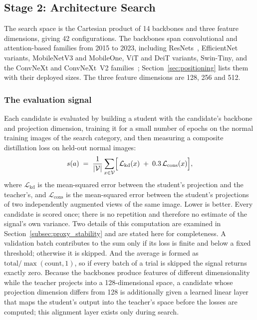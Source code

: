 \subsection{Stage 2: Architecture Search}
\label{subsec:nas}

The search space is the Cartesian product of 14 backbones and three feature
dimensions, giving 42 configurations. The backbones span convolutional and
attention-based families from 2015 to 2023, including
ResNets~\cite{he2016deep}, EfficientNet variants, MobileNetV3 and MobileOne, ViT
and DeiT variants, Swin-Tiny, and the ConvNeXt and ConvNeXt~V2
families~\cite{woo2023convnextv2}; Section~\ref{sec:positioning} lists them with
their deployed sizes. The three feature dimensions are 128, 256 and 512.

\subsubsection*{The evaluation signal}
Each candidate is evaluated by building a student with the candidate's backbone
and projection dimension, training it for a small number of epochs on the normal
training images of the search category, and then measuring a composite
distillation loss on held-out normal images:
%
\begin{equation}
\label{eq:proxy}
s(a) \;=\; \frac{1}{|\mathcal{V}|}\sum_{x \in \mathcal{V}}
\Bigl[\, \mathcal{L}_{\mathrm{kd}}(x) \;+\; 0.3\,\mathcal{L}_{\mathrm{cons}}(x) \Bigr],
\end{equation}
%
where $\mathcal{L}_{\mathrm{kd}}$ is the mean-squared error between the student's
projection and the teacher's, and $\mathcal{L}_{\mathrm{cons}}$ is the
mean-squared error between the student's projections of two independently
augmented views of the same image. Lower is better. Every candidate is scored once;
there is no repetition and therefore no estimate of the signal's own variance.
Two details of this computation are examined in
Section~\ref{subsec:proxy_stability} and are stated here for completeness. A
validation batch contributes to the sum only if its loss is finite and below a
fixed threshold; otherwise it is skipped. And the average is formed as
$\text{total} / \max(\text{count}, 1)$, so if every batch of a trial is skipped the
signal returns exactly zero. Because the backbones produce features of different
dimensionality while the teacher projects into a 128-dimensional space, a
candidate whose projection dimension differs from 128 is additionally given a
learned linear layer that maps the student's output into the teacher's space
before the losses are computed; this alignment layer exists only during search.

